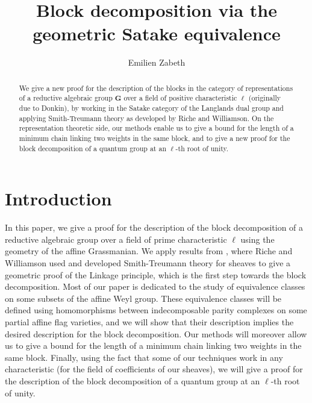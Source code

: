\documentclass[11pt]{amsart}
\theoremstyle{plain}
\theoremstyle{remark}
\numberwithin{equation}{section}
\begin{document}
\title{Block decomposition via the geometric Satake equivalence}
	
\author{Emilien Zabeth}
\address{Université Clermont Auvergne, CNRS, LMBP\\
F-63000 Clermont-Ferrand, France}

\begin{abstract}
We give a new proof for the description of the blocks in the category of representations of a reductive algebraic group $\mathbf{G}$ over a field of positive characteristic $\ell$ (originally due to Donkin), by working in the Satake category of the Langlands dual group and applying Smith-Treumann theory as developed by Riche and Williamson. On the representation theoretic side, our methods enable us to give a bound for the length of a minimum chain linking two weights in the same block, and to give a new proof for the block decomposition of a quantum group at an $\ell$-th root of unity.
\end{abstract}
\maketitle
	\setcounter{tocdepth}{1}
	\tableofcontents
	\section{Introduction}
	In this paper, we give a proof for the description of the block decomposition of a reductive algebraic group over a field of prime characteristic $\ell$ using the geometry of the affine Grassmanian. We apply results from \cite{riche2020smithtreumann}, where Riche and Williamson used and developed Smith-Treumann theory for sheaves to give a geometric proof of the Linkage principle, which is the first step towards the block decomposition. Most of our paper is dedicated to the study of equivalence classes on some subsets of the affine Weyl group. These equivalence classes will be defined using homomorphisms between indecomposable parity complexes on some partial affine flag varieties, and we will show that their description implies the desired description for the block decomposition. Our methods will moreover allow us to give a bound for the length of a minimum chain linking two weights in the same block. Finally, using the fact that some of our techniques work in any characteristic (for the field of coefficients of our sheaves), we will give a proof for the description of the block decomposition of a quantum group at an $\ell$-th root of unity.
	
\end{document}
